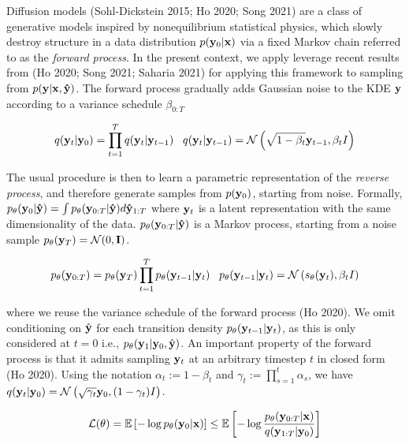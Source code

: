 \documentclass{article}
\begin{document}
Diffusion models (Sohl-Dickstein 2015; Ho 2020; Song 2021) are a class of generative models inspired by nonequilibrium statistical physics, which slowly destroy structure in a data distribution $p(\bold{y}_{0}|\bold{x})$ via a fixed Markov chain referred to as the \emph{forward process}. In the present context, we apply leverage recent results from (Ho 2020; Song 2021; Saharia 2021) for applying this framework to sampling from $p(\bold{y}|\bold{x},\bold{\hat{y}})$. The forward process gradually adds Gaussian noise to the KDE $\bold{y}$ according to a variance schedule $\beta_{0:T}$

\begin{equation}
q(\bold{y}_{t}|\bold{y}_{0}) = \prod_{t=1}^{T}q(\bold{y}_{t}|\bold{y}_{t-1}) \;\;\; q(\bold{y}_{t}|\bold{y}_{t-1}) = \mathcal{N}\left(\sqrt{1-\beta_{t}}\bold{y}_{t-1},\beta_t I\right)
\end{equation}

The usual procedure is then to learn a parametric representation of the \emph{reverse process}, and therefore generate samples from  $p(\bold{y}_{0})$, starting from noise. Formally, $p_{\theta}(\bold{y}_{0}|\bold{\hat{y}}) = \int p_{\theta}(\bold{y}_{0:T}|\bold{\hat{y}})d\bold{\hat{y}}_{1:T}$ where $\bold{y}_{t}$ is a latent representation with the same dimensionality of the data.  $p_{\theta}(\bold{y}_{0:T}|\bold{\hat{y}})$ is a Markov process, starting from a noise sample $p_{\theta}(\bold{y}_{T}) = \mathcal{N}(0,\bold{I})$. 

\begin{equation}
p_{\theta}(\bold{y}_{0:T}) = p_{\theta}(\bold{y}_{T})\prod_{t=1}^{T} p_{\theta}(\bold{y}_{t-1}|\bold{y}_{t}) \;\;\; p_{\theta}(\bold{y}_{t-1}|\bold{y}_{t}) = \mathcal{N}\left(s_{\theta}(\bold{y}_{t}),\beta_{t}I\right)
\end{equation}

where we reuse the variance schedule of the forward process (Ho 2020). We omit conditioning on $\hat{\bold{y}}$ for each transition density $p_{\theta}(\bold{y}_{t-1}|\bold{y}_{t})$, as this is only considered at $t=0$ i.e., $p_{\theta}(\bold{y}_{1}|\bold{y}_{0},\hat{\bold{y}})$. An important property of the forward process is that it admits sampling $\bold{y}_t$ at an arbitrary timestep $t$ in closed form (Ho 2020). Using the notation $\alpha_t := 1 - \beta_t$ and $\gamma_t := \prod_{s=1}^{t} \alpha_s$, we have $q(\bold{y}_t|\bold{y}_0) = \mathcal{N} \left(\sqrt{\gamma_{t}} \bold{y}_{0}, (1 - \gamma_t)I \right)$.

\begin{equation}
\mathcal{L}(\theta) = \mathbb{E}\left[-\log p_{\theta}(\bold{y}_{0}|\bold{x})\right] \leq  \mathbb{E}\left[-\log \frac{p_{\theta}(\bold{y}_{0:T}|\bold{x})}{q(\bold{y}_{1:T}|\bold{y}_{0})}\right]
\end{equation}
\end{document}
